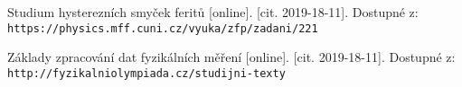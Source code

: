 \documentclass{article}
\begin{document}
\renewcommand\refname{Použitá literatura}
\begin{thebibliography}{}
Studium hysterezních smyček feritů [online]. [cit. 2019-18-11]. Dostupné z: 
\\\texttt{https://physics.mff.cuni.cz/vyuka/zfp/zadani/221}



Základy zpracování dat fyzikálních měření [online]. [cit. 2019-18-11].
\newline Dostupné z:\\\texttt{http://fyzikalniolympiada.cz/studijni-texty}






\end{thebibliography}
\end{document}
